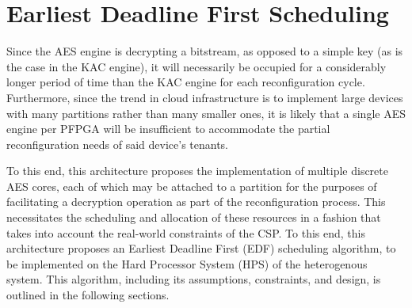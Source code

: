 
\chapter{Earliest Deadline First Scheduling}\label{ch:edfScheduling}

Since the AES engine is decrypting a bitstream, as opposed to a simple key (as is the case in the KAC engine), it will necessarily be occupied for a considerably longer period of time than the KAC engine for each reconfiguration cycle. Furthermore, since the trend in cloud infrastructure is to implement large devices with many partitions rather than many smaller ones, it is likely that a single AES engine per PFPGA will be insufficient to accommodate the partial reconfiguration needs of said device's tenants.

To this end, this architecture proposes the implementation of multiple discrete AES cores, each of which may be attached to a partition for the purposes of facilitating a decryption operation as part of the reconfiguration process. This necessitates the scheduling and allocation of these resources in a fashion that takes into account the real-world constraints of the CSP. To this end, this architecture proposes an Earliest Deadline First (EDF) scheduling algorithm, to be implemented on the Hard Processor System (HPS) of the heterogenous system. This algorithm, including its assumptions, constraints, and design, is outlined in the following sections.

